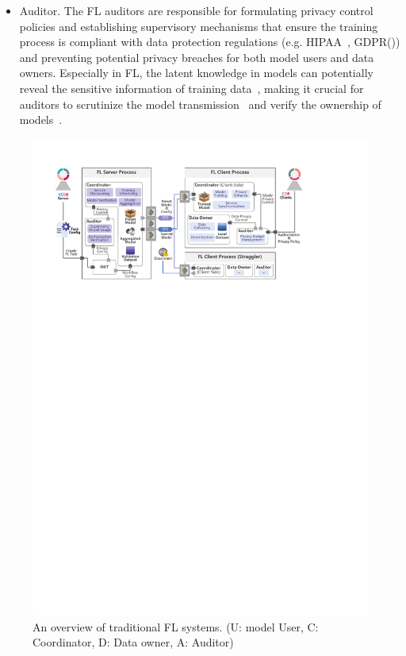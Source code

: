 \begin{itemize}
    \item Auditor. The FL auditors are responsible for formulating privacy control policies and establishing supervisory mechanisms that ensure the training process is compliant with data protection regulations (e.g. HIPAA~\cite{act1996health}, GDPR(\cite{voigt2017eu})) and preventing potential privacy breaches for both model users and data owners. Especially in FL, the latent knowledge in models can potentially reveal the sensitive information of training data~\cite{wang2019beyond, zhu2019deep, jin2021cafe}, making it crucial for auditors to scrutinize the model transmission~\cite{wei2021gradient, li2022auditing} and verify the ownership of models~\cite{tekgul2021waffle, shao2022fedtracker}.
\end{itemize}

\begin{figure}[t]
    \centering
    \includegraphics[width=\linewidth]{fig/fl_frame.pdf}
    \caption{An overview of traditional FL systems. (U: model User, C: Coordinator, D: Data owner, A: Auditor)}
    \Description{}
    \label{fig:fl}
  \end{figure}

